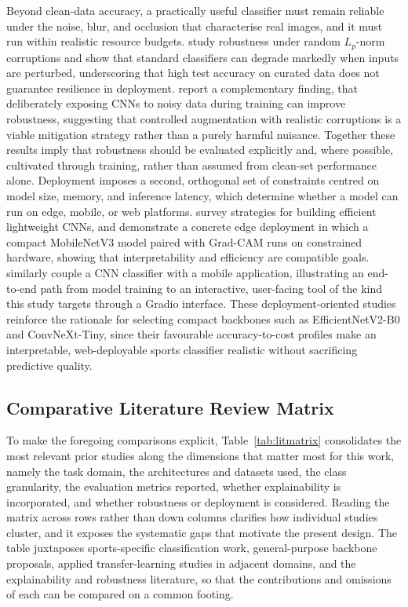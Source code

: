 Beyond clean-data accuracy, a practically useful classifier must remain reliable under the noise, blur, and occlusion that characterise real images, and it must run within realistic resource budgets.
\citet{siedel2023corruption} study robustness under random $L_p$-norm corruptions and show that standard classifiers can degrade markedly when inputs are perturbed, underscoring that high test accuracy on curated data does not guarantee resilience in deployment.
\citet{ramirezagudelo2026noisy} report a complementary finding, that deliberately exposing CNNs to noisy data during training can improve robustness, suggesting that controlled augmentation with realistic corruptions is a viable mitigation strategy rather than a purely harmful nuisance.
Together these results imply that robustness should be evaluated explicitly and, where possible, cultivated through training, rather than assumed from clean-set performance alone.
Deployment imposes a second, orthogonal set of constraints centred on model size, memory, and inference latency, which determine whether a model can run on edge, mobile, or web platforms.
\citet{isong2025lightweight} survey strategies for building efficient lightweight CNNs, and \citet{karim2024grapeleaf} demonstrate a concrete edge deployment in which a compact MobileNetV3 model paired with Grad-CAM runs on constrained hardware, showing that interpretability and efficiency are compatible goals.
\citet{foysal2024plantleaf} similarly couple a CNN classifier with a mobile application, illustrating an end-to-end path from model training to an interactive, user-facing tool of the kind this study targets through a Gradio interface.
These deployment-oriented studies reinforce the rationale for selecting compact backbones such as EfficientNetV2-B0 and ConvNeXt-Tiny, since their favourable accuracy-to-cost profiles make an interpretable, web-deployable sports classifier realistic without sacrificing predictive quality.

\subsection{Comparative Literature Review Matrix}
\label{subsec:litmatrix}

To make the foregoing comparisons explicit, Table~\ref{tab:litmatrix} consolidates the most relevant prior studies along the dimensions that matter most for this work, namely the task domain, the architectures and datasets used, the class granularity, the evaluation metrics reported, whether explainability is incorporated, and whether robustness or deployment is considered.
Reading the matrix across rows rather than down columns clarifies how individual studies cluster, and it exposes the systematic gaps that motivate the present design.
The table juxtaposes sports-specific classification work, general-purpose backbone proposals, applied transfer-learning studies in adjacent domains, and the explainability and robustness literature, so that the contributions and omissions of each can be compared on a common footing.

